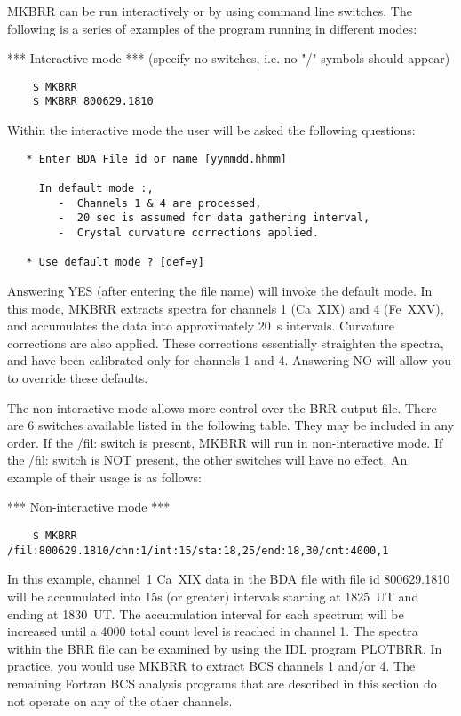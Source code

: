     MKBRR can be run interactively or by using command line switches. 
    The following is a series of examples of the program running in different
    modes:
\begin{center}
                   ***	Interactive mode    ***
\newline	(specify no switches, i.e. no "/" symbols should appear)
\end{center}
\begin{verbatim}
    $ MKBRR
    $ MKBRR 800629.1810
\end{verbatim}
  Within the  interactive mode the user will be asked the following questions:
\begin{verbatim}
   * Enter BDA File id or name [yymmdd.hhmm]

     In default mode :,
        -  Channels 1 & 4 are processed,
        -  20 sec is assumed for data gathering interval,
        -  Crystal curvature corrections applied.

   * Use default mode ? [def=y]
\end{verbatim}          
Answering YES (after entering the file name) will invoke the default
mode. In this mode, MKBRR extracts spectra for channels 1 (Ca~XIX) and 4
(Fe~XXV), and accumulates the data into approximately 20~s intervals. Curvature
corrections are also applied. These corrections essentially straighten the
spectra, and have been calibrated only for channels 1 and 4. Answering NO
will allow you to override these defaults.
 
The non-interactive mode allows more control over the BRR output file.
There are 6 switches available listed in the following table.  
    They may be included in any order.
    If the /fil: switch is present, MKBRR will run in non-interactive mode.
    If the /fil: switch is NOT present, the other switches will have no effect.
  An example of their usage is as follows:
\begin{center}
                   ***	Non-interactive mode    ***
\end{center}
\begin{verbatim}
    $ MKBRR /fil:800629.1810/chn:1/int:15/sta:18,25/end:18,30/cnt:4000,1
\end{verbatim}
In this example, channel~1 Ca~XIX  data in the BDA file with file id
800629.1810 will be accumulated into 15s (or greater)  intervals starting at
1825~UT and ending at 1830~UT. The accumulation interval for each spectrum
will be increased until a 4000 total count level is reached in channel 1.  The
spectra within the BRR file can be examined by using the IDL program PLOTBRR.
In practice, you would use MKBRR to extract BCS channels 1 and/or 4.
The remaining Fortran BCS analysis programs that are described in this section
do not operate on any of the other channels.

